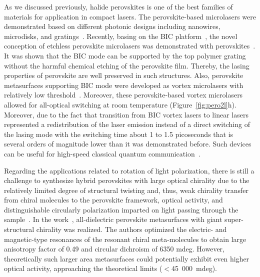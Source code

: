 \documentclass[journal=chreay,manuscript=review]{achemso}
\begin{document}

As we discussed previously, halide perovskites is one of the best families of materials for application in compact lasers. The perovskite-based microlasers were demonstrated based on different photonic designs including nanowires, microdisks, and gratings~\cite{zhu2015lead,zhang2017advances,wei2019recent,polushkin2020single,qin2020stable}. Recently, basing on the BIC platform~\cite{kodigala2017lasing}, the novel conception of etchless perovskite microlasers was demonstrated with perovskites~\cite{wang2021highly}. It was shown that the BIC mode can be supported by the top polymer grating without the harmful chemical etching of the perovskite film. Thereby, the lasing properties of perovskite are well preserved in such structures. Also, perovskite metasurfaces supporting BIC mode were developed as vortex microlasers with relatively low threshold~\cite{huang2020ultrafast}. Moreover, these perovskite-based vortex microlasers allowed for all-optical switching at room temperature (Figure~\ref{fig:pero2l}h). Moreover, due to the fact that transition from BIC vortex lasers to linear lasers represented a redistribution of the laser emission instead of a direct switching of the lasing mode with the switching time about 1 to 1.5 picoseconds that is several orders of magnitude lower than it was demonstrated before. Such devices can be useful for high-speed classical quantum communication~\cite{qiu2017vortex}.


Regarding the applications related to rotation of light polarization, there is still a challenge to synthesize hybrid perovskites with large optical chirality due to the relatively limited degree of structural twisting and, thus, weak chirality transfer from chiral molecules to the perovskite framework, optical activity, and distinguishable circularly polarization imparted on light passing through the sample~\cite{long2020chiral}. In the work~\cite{long2022perovskite}, all-dielectric perovskite metasurfaces with giant super-structural chirality was realized. The authors optimized the electric- and magnetic-type resonances of the resonant chiral meta-molecules to obtain large anisotropy factor of 0.49 and circular dichroism of 6350 mdeg. However, theoretically such larger area metasurfaces could potentially exhibit even higher optical activity, approaching the theoretical limits ($<$45~000~mdeg).

\end{document}
